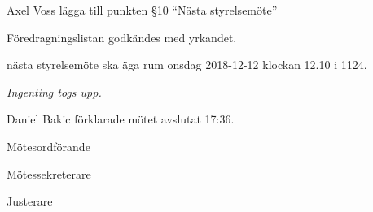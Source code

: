 \documentclass[10pt]{article}
\def\mo{Daniel Bakic}
\def\ms{Axel Voss}
\def\ji{Magnus Lundh}
\begin{document}
\begin{paragrafer}
	

	Axel Voss \ypa lägga till punkten \S10 ``Nästa styrelsemöte''
	
	Föredragningslistan godkändes med yrkandet.


	\begin{fyllnadsval} %
	\end{fyllnadsval}


	\Mba nästa styrelsemöte ska äga rum onsdag 2018-12-12 klockan 12.10 i 1124.


	\emph{Ingenting togs upp.}

	
	{\mo} förklarade mötet avslutat 17:36.

\end{paragrafer}

\hidesignfoot
\begin{signatures}{3}
	\signature{\mo}{Mötesordförande}
	\signature{\ms}{Mötessekreterare}
	\signature{\ji}{Justerare}
\end{signatures}
\end{document}
